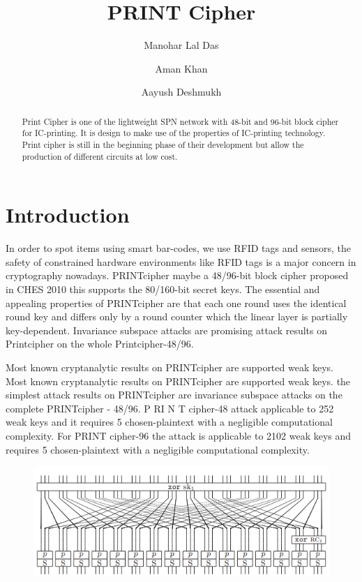 \documentclass[journal=tosc,preprint]{iacrtrans}
\author{Manohar Lal Das \and Aman Khan \and Aayush Deshmukh}
\institute{
  IIT Bhilai, Raipur, India, \email{manoharlal@iitbhilai.ac.in}
  \and
  IIT Bhilai, Raipur, India, \email{amankhan@iitbhilai.ac.in}
  \and
  IIT Bhilai, Raipur, India, \email{aayushd@iitbhilai.ac.in}
}
\title{PRINT Cipher}
\begin{document}
\maketitle




\begin{abstract}
  Print Cipher is one of the lightweight SPN network with 48-bit and 96-bit block cipher for IC-printing. It is design to make use of the properties of IC-printing technology. Print cipher is still in the beginning phase of their development but allow the production of different circuits at low cost.
\end{abstract}


\section{Introduction}

In order to spot items using smart bar-codes, we use RFID tags and sensors, the
safety of constrained hardware environments like RFID tags is a major concern
in cryptography nowadays. PRINTcipher maybe a 48/96-bit block cipher
proposed in CHES 2010 this supports the 80/160-bit secret keys. The essential
and appealing properties of PRINTcipher are that each one round uses the
identical round key and differs only by a round counter which the linear layer is
partially key-dependent. Invariance subspace attacks are promising attack
results on Printcipher on the whole Printcipher-48/96.


Most known cryptanalytic results on PRINTcipher are supported weak keys. Most
known cryptanalytic results on PRINTcipher are supported weak keys. the
simplest attack results on PRINTcipher are invariance subspace attacks on the
complete PRINTcipher - 48/96. P RI N T cipher-48 attack applicable to 252
weak keys and it requires 5 chosen-plaintext with a negligible computational
complexity. For PRINT cipher-96 the attack is applicable to 2102 weak keys
and requires 5 chosen-plaintext with a negligible computational complexity.

\begin{figure}[h]
	\includegraphics[width=\linewidth]{pics/printcipher.png}
\end{figure}
\end{document}
